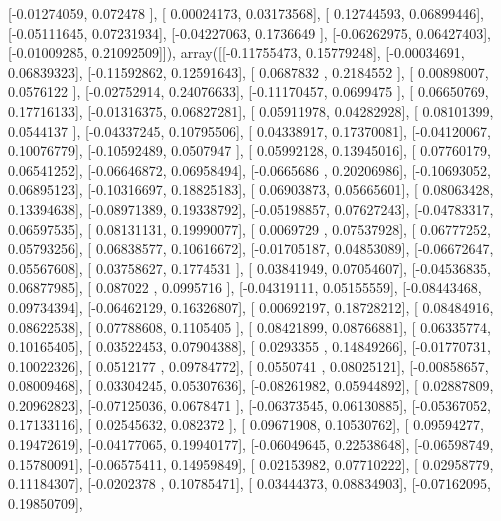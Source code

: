 \documentclass{article}
\begin{document}
       [-0.01274059,  0.072478  ],
       [ 0.00024173,  0.03173568],
       [ 0.12744593,  0.06899446],
       [-0.05111645,  0.07231934],
       [-0.04227063,  0.1736649 ],
       [-0.06262975,  0.06427403],
       [-0.01009285,  0.21092509]]), array([[-0.11755473,  0.15779248],
       [-0.00034691,  0.06839323],
       [-0.11592862,  0.12591643],
       [ 0.0687832 ,  0.2184552 ],
       [ 0.00898007,  0.0576122 ],
       [-0.02752914,  0.24076633],
       [-0.11170457,  0.0699475 ],
       [ 0.06650769,  0.17716133],
       [-0.01316375,  0.06827281],
       [ 0.05911978,  0.04282928],
       [ 0.08101399,  0.0544137 ],
       [-0.04337245,  0.10795506],
       [ 0.04338917,  0.17370081],
       [-0.04120067,  0.10076779],
       [-0.10592489,  0.0507947 ],
       [ 0.05992128,  0.13945016],
       [ 0.07760179,  0.06541252],
       [-0.06646872,  0.06958494],
       [-0.0665686 ,  0.20206986],
       [-0.10693052,  0.06895123],
       [-0.10316697,  0.18825183],
       [ 0.06903873,  0.05665601],
       [ 0.08063428,  0.13394638],
       [-0.08971389,  0.19338792],
       [-0.05198857,  0.07627243],
       [-0.04783317,  0.06597535],
       [ 0.08131131,  0.19990077],
       [ 0.0069729 ,  0.07537928],
       [ 0.06777252,  0.05793256],
       [ 0.06838577,  0.10616672],
       [-0.01705187,  0.04853089],
       [-0.06672647,  0.05567608],
       [ 0.03758627,  0.1774531 ],
       [ 0.03841949,  0.07054607],
       [-0.04536835,  0.06877985],
       [ 0.087022  ,  0.0995716 ],
       [-0.04319111,  0.05155559],
       [-0.08443468,  0.09734394],
       [-0.06462129,  0.16326807],
       [ 0.00692197,  0.18728212],
       [ 0.08484916,  0.08622538],
       [ 0.07788608,  0.1105405 ],
       [ 0.08421899,  0.08766881],
       [ 0.06335774,  0.10165405],
       [ 0.03522453,  0.07904388],
       [ 0.0293355 ,  0.14849266],
       [-0.01770731,  0.10022326],
       [ 0.0512177 ,  0.09784772],
       [ 0.0550741 ,  0.08025121],
       [-0.00858657,  0.08009468],
       [ 0.03304245,  0.05307636],
       [-0.08261982,  0.05944892],
       [ 0.02887809,  0.20962823],
       [-0.07125036,  0.0678471 ],
       [-0.06373545,  0.06130885],
       [-0.05367052,  0.17133116],
       [ 0.02545632,  0.082372  ],
       [ 0.09671908,  0.10530762],
       [ 0.09594277,  0.19472619],
       [-0.04177065,  0.19940177],
       [-0.06049645,  0.22538648],
       [-0.06598749,  0.15780091],
       [-0.06575411,  0.14959849],
       [ 0.02153982,  0.07710222],
       [ 0.02958779,  0.11184307],
       [-0.0202378 ,  0.10785471],
       [ 0.03444373,  0.08834903],
       [-0.07162095,  0.19850709],
\end{document}
